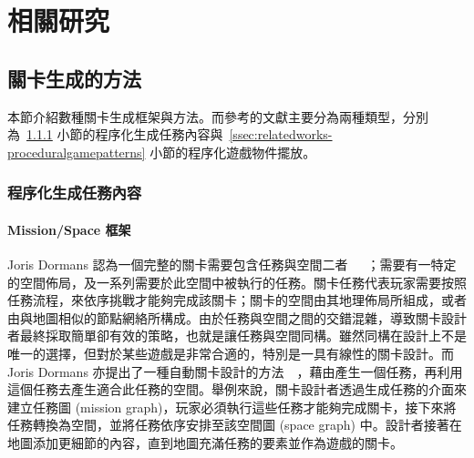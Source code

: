\chapter{相關研究}
\label{cha:relatedworks}





\section{關卡生成的方法}
\label{sec:relatedworks-levelgeneration}

本節介紹數種關卡生成框架與方法。而參考的文獻主要分為兩種類型，分別為~\ref{ssec:relatedworks-proceduralmission} 小節的程序化生成任務內容與~\ref{ssec:relatedworks-proceduralgamepatterns} 小節的程序化遊戲物件擺放。

\subsection{程序化生成任務內容}
\label{ssec:relatedworks-proceduralmission}


\subsubsection{Mission/Space 框架}
\label{sssec:relatedworks-proceduralmission-missionspace}

Joris Dormans 認為一個完整的關卡需要包含任務與空間二者~\cite{dormans2010adventures}~\cite{dormans2011level}~\cite{dormans2012engineering}；需要有一特定的空間佈局，及一系列需要於此空間中被執行的任務。關卡任務代表玩家需要按照任務流程，來依序挑戰才能夠完成該關卡；關卡的空間由其地理佈局所組成，或者由與地圖相似的節點網絡所構成。由於任務與空間之間的交錯混雜，導致關卡設計者最終採取簡單卻有效的策略，也就是讓任務與空間同構。雖然同構在設計上不是唯一的選擇，但對於某些遊戲是非常合適的，特別是一具有線性的關卡設計。而 Joris Dormans 亦提出了一種自動關卡設計的方法~\cite{dormans2010adventures}~\cite{dormans2012engineering}，藉由產生一個任務，再利用這個任務去產生適合此任務的空間。舉例來說，關卡設計者透過生成任務的介面來建立任務圖 (mission graph)，玩家必須執行這些任務才能夠完成關卡，接下來將任務轉換為空間，並將任務依序安排至該空間圖 (space graph) 中。設計者接著在地圖添加更細節的內容，直到地圖充滿任務的要素並作為遊戲的關卡。


